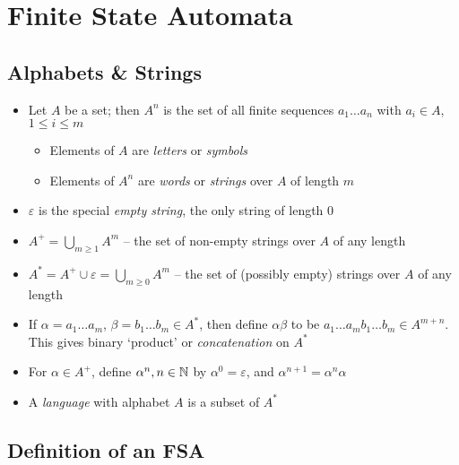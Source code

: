 \section{Finite State Automata}

\subsection{Alphabets \& Strings}

\begin{itemize}
	
	\item Let $ A $ be a set; then $ A^n $ is the set of all finite sequences $ a_1 \dots a_n $ with $ a_i \in A $, $ 1 \le i \le m $
	
	\begin{itemize}
		\item Elements of $ A $ are \textit{letters} or \textit{symbols}
		
		\item Elements of $ A^n $ are \textit{words} or \textit{strings} over $ A $ of length $ m $
	\end{itemize}

	\item $ \varepsilon $ is the special \textit{empty string}, the only string of length $ 0 $

	\item $ A^+ = \bigcup_{m \ge 1} A^m $ -- the set of non-empty strings over $ A $ of any length
	
	\item $ A^* = A^+ \cup \varepsilon = \bigcup_{m \ge 0} A^m$ -- the set of (possibly empty) strings over $ A $ of any length
	
	\item If $ \alpha = a_1 \dots a_m $, $ \beta = b_1 \dots b_m \in A^* $, then define $ \alpha \beta $ to be $ a_1 \dots a_m b_1 \dots b_m \in A^{m + n} $. This gives binary `product' or \textit{concatenation} on $ A^* $
	
	\item For $ \alpha \in A^+ $, define $ \alpha^n, n \in \mathbb{N} $ by $ \alpha^0 = \varepsilon $, and $ \alpha^{n+1} = \alpha^n \alpha $
	
	\item A \textit{language} with alphabet $ A $ is a subset of $ A^* $
	
\end{itemize}

\clearpage

\subsection{Definition of an FSA}

